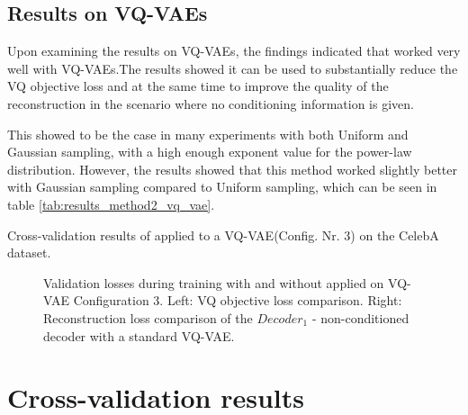 \subsection{Results on VQ-VAEs}

Upon examining the results on VQ-VAEs, the findings indicated that  worked very well with VQ-VAEs.The results showed it can be used to substantially reduce the VQ objective loss and at the same time to improve the quality of the reconstruction in the scenario where no conditioning information is given. 

This showed to be the case in many experiments with both Uniform and Gaussian sampling, with a high enough exponent value for the power-law distribution. However, the results showed that this method worked slightly better with Gaussian sampling compared to Uniform sampling, which can be seen in table \ref{tab:results_method2_vq_vae}.



\begin{table}[H]
    \centering
    
    \caption{Cross-validation results of  applied to a VQ-VAE(Config. Nr. 3) on the CelebA dataset.}
    \label{tab:results_method2_vq_vae}
\end{table}
\begin{figure}[H]
    \centering
    \scalebox{0.48}{}
    \scalebox{0.48}{}
    \caption[Validation loss comparison during training of a VQ-VAE.]
    {
        Validation losses during training with and without  applied on VQ-VAE Configuration 3.
        Left: VQ objective loss comparison. Right: Reconstruction loss comparison of the $Decoder_1$ - non-conditioned decoder with a standard VQ-VAE.
    }
    \label{fig:results_method2_vq_vae}
\end{figure}

\section{Cross-validation results} \label{sec:cross_val_results}

